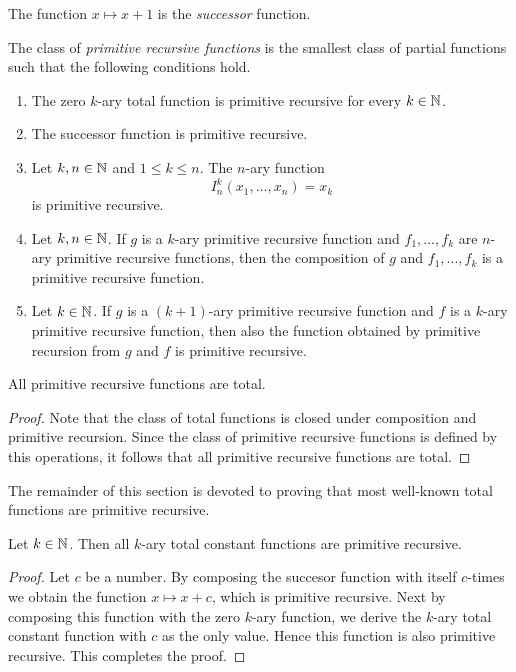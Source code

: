 \documentclass[10pt]{amsart}
\begin{document}
\begin{definition}
	The function $x \mapsto x + 1$ is the \textit{successor} function.
\end{definition}

\begin{definition}
	The class of \textit{primitive recursive functions} is the smallest class of partial functions such that the following conditions hold.
	\begin{enumerate}[label=\textbf{(\arabic*)}, leftmargin=3.0em]
		\item The zero $k$-ary total function is primitive recursive for every $k \in {\mathbb N}$.
		\item The successor function is primitive recursive.
		\item Let $k,n\in {\mathbb N}$ and $1\leq k \leq n$. The $n$-ary function
		      $$I^k_n(x_1,...,x_n) = x_k$$
		      is primitive recursive.
		\item Let $k,n \in {\mathbb N}$. If $g$ is a $k$-ary primitive recursive function and $f_1,...,f_k$ are $n$-ary primitive recursive functions, then the composition of $g$ and $f_1,...,f_k$ is a primitive recursive function.
		\item Let $k \in {\mathbb N}$. If $g$ is a $(k+1)$-ary primitive recursive function and $f$ is a $k$-ary primitive recursive function, then also the function obtained by primitive recursion from $g$ and $f$ is primitive recursive.
	\end{enumerate}
\end{definition}

\begin{proposition}\label{proposition:all_primitive_recursive_functions_are_total}
	All primitive recursive functions are total.
\end{proposition}
\begin{proof}
	Note that the class of total functions is closed under composition and primitive recursion. Since the class of primitive recursive functions is defined by this operations, it follows that all primitive recursive functions are total.
\end{proof}
\noindent
The remainder of this section is devoted to proving that most well-known total functions are primitive recursive.

\begin{proposition}\label{proposition:all_constant_functions_are_primitive_recursive}
	Let $k \in {\mathbb N}$. Then all $k$-ary total constant functions are primitive recursive.
\end{proposition}
\begin{proof}
	Let $c$ be a number. By composing the succesor function with itself $c$-times we obtain the function $x \mapsto x + c$, which is primitive recursive. Next by composing this function with the zero $k$-ary function, we derive the $k$-ary total constant function with $c$ as the only value. Hence this function is also primitive recursive. This completes the proof.
\end{proof}
\end{document}
